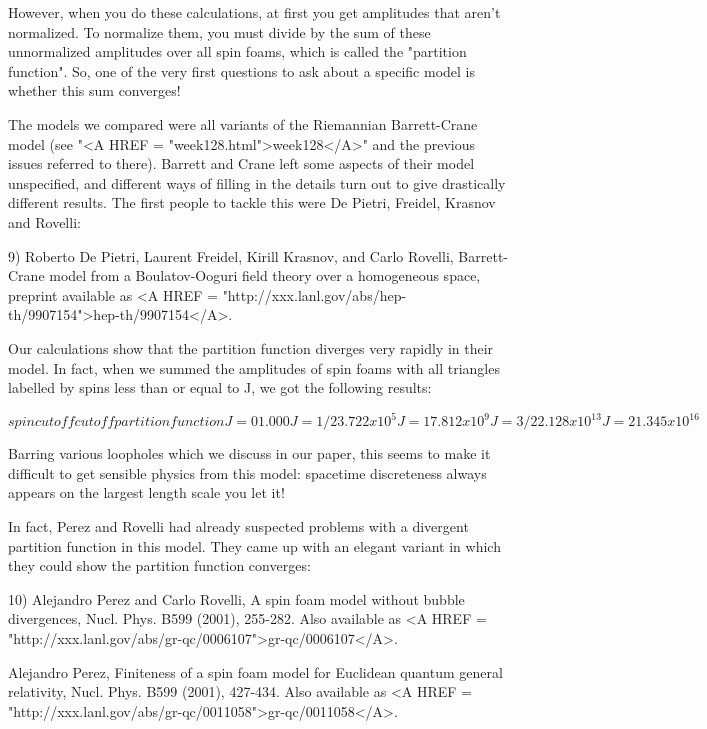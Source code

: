 However, when you do these calculations, at first you get amplitudes
that aren't normalized.  To normalize them, you must divide by the sum
of these unnormalized amplitudes over all spin foams, which is called
the "partition function".  So, one of the very first questions to ask
about a specific model is whether this sum converges!

The models we compared were all variants of the Riemannian Barrett-Crane
model (see "<A HREF = "week128.html">week128</A>" and the
previous issues referred to there).  Barrett and Crane left some aspects
of their model unspecified, and different ways of filling in the details
turn out to give drastically different results.  The first people to
tackle this were De Pietri, Freidel, Krasnov and Rovelli:

9) Roberto De Pietri, Laurent Freidel, Kirill Krasnov, and Carlo
Rovelli, Barrett-Crane model from a Boulatov-Ooguri field theory over 
a homogeneous space, preprint available as <A HREF = "http://xxx.lanl.gov/abs/hep-th/9907154">hep-th/9907154</A>. 

Our calculations show that the partition function diverges very rapidly 
in their model.  In fact, when we summed the amplitudes of spin foams
with all triangles labelled by spins less than or equal to J, 
we got the following results:


$$

spin cutoff               cutoff partition function 

J = 0                         1.000 
J = 1/2                       3.722 x 10^{5}
J = 1                         7.812 x 10^{9}
J = 3/2                       2.128 x 10^{13}
J = 2                         1.345 x 10^{16}
$$
    
Barring various loopholes which we discuss in our paper, this seems
to make it difficult to get sensible physics from this model: spacetime
discreteness always appears on the largest length scale you let it!

In fact, Perez and Rovelli had already suspected problems with a divergent
partition function in this model.  They came up with an elegant variant
in which they could show the partition function converges:

10) Alejandro Perez and Carlo Rovelli, A spin foam model without bubble
divergences, Nucl. Phys. B599 (2001), 255-282.  Also available as
<A HREF = "http://xxx.lanl.gov/abs/gr-qc/0006107">gr-qc/0006107</A>. 

Alejandro Perez, Finiteness of a spin foam model for Euclidean quantum
general relativity, Nucl. Phys. B599 (2001), 427-434.  Also available as
<A HREF = "http://xxx.lanl.gov/abs/gr-qc/0011058">gr-qc/0011058</A>.

